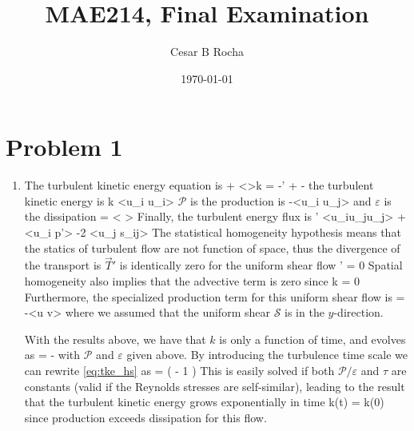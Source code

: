 \documentclass[11pt]{article}
\title{MAE214, Final Examination}
\author{Cesar B Rocha}
\date{\today}
\begin{document}


\maketitle

\section*{Problem 1}


\begin{enumerate}[label=(\alph*)]

    \item The turbulent kinetic energy equation is
        \beq
            \label{eq:tke}
             + <>\cdot\nabla k = -\nabla\cdot {}' +
              -\varepsilon \com
        \eeq
        the turbulent kinetic energy is
        \beq    
             k  {}<u_i u_i>\com
        \eeq
        $\mathcal{P}$ is the production is
        \beq    
         -<u_i u_j> \per
        \eeq
        and $\varepsilon$ is the dissipation
        \beq
            \varepsilon = \nu \left< \right>\per
        \eeq
        Finally, the turbulent energy flux is
        \beq
        '  {}<u_iu_ju_j> + <u_i p'> -2 \nu <u_j s_{ij}>\per
        \eeq
        The statistical homogeneity hypothesis means that the statics of turbulent flow
        are not function of space, thus the divergence of the transport is $\vec{T}'$ 
        is identically zero for the uniform shear flow
        \beq
            \nabla\cdot {}' = 0\per
        \eeq
        Spatial homogeneity also implies that the advective term is zero since
        \beq
            \nabla k = 0\per
        \eeq
        Furthermore, the specialized production term for this uniform shear flow is
        \beq
        \label{eq:prod}
         = -<u v> \com
        \eeq
        where we assumed that the uniform shear $\mathcal{S}$ is in the $y$-direction. 
        
        
        With the results above, we have that $k$ is only a function of time, and evolves as
        \beq    
        \label{eq:tke_hs}
         =  - \varepsilon\com 
        \eeq
        with $\mathcal{P}$ and $\varepsilon$ given above. By introducing the turbulence time scale
        \beq
            \tau {} {}\com
        \eeq
        we can rewrite \eqref{eq:tke_hs} as
        \beq
         = \left( - 1
        \right)\per
        \eeq
        This is easily solved if both $\mathcal{P}/\varepsilon$ and $\tau$ are constants (valid if
        the Reynolds stresses are self-similar), leading 
        to the result that the turbulent kinetic energy grows exponentially in time
        \beq
            \label{eq:exp_tke}
            k(t) = k(0) \exp{}\com
        \eeq
        since production exceeds dissipation for this flow.


\end{enumerate}
\end{document}
